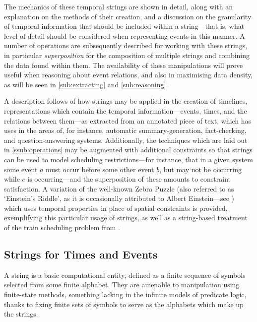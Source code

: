 \documentclass[a4paper,12pt,leqno]{article}
\begin{document}
The mechanics of these temporal strings are shown in detail, along with an explanation on the methods of their creation, and a discussion on the granularity of temporal information that should be included within a string---that is, what level of detail should be considered when representing events in this manner. A number of operations are subsequently described for working with these strings, in particular \textit{superposition} for the composition of multiple strings and combining the data found within them. The availability of these manipulations will prove useful when reasoning about event relations, and also in maximising data density, as will be seen in \cref{sub:extracting} and \cref{sub:reasoning}.

A description follows of how strings may be applied in the creation of timelines, representations which contain the temporal information---events, times, and the relations between them---as extracted from an annotated piece of text, which has uses in the areas of, for instance, automatic summary-generation, fact-checking, and question-answering systems. Additionally, the techniques which are laid out in \cref{ssub:operations} may be augmented with additional constraints so that strings can be used to model scheduling restrictions---for instance, that in a given system some event $a$ must occur before some other event $b$, but may not be occurring while $c$ is occurring---and the superposition of these amounts to constraint satisfaction. A variation of the well-known Zebra Puzzle (also referred to as `Einstein's Riddle', as it is occasionally attributed to Albert Einstein---see \citet[p. 10]{stangroom2009einstein}) which uses temporal properties in place of spatial constraints is provided, exemplifying this particular usage of strings, as well as a string-based treatment of the train scheduling problem from \citet{durand2008tool}.

\subsection{Strings for Times and Events}\label{sub:strings}
A string is a basic computational entity, defined as a finite sequence of symbols selected from some finite alphabet. They are amenable to manipulation using finite-state methods, something lacking in the infinite models of predicate logic, thanks to fixing finite sets of symbols to serve as the alphabets which make up the strings.
\end{document}
